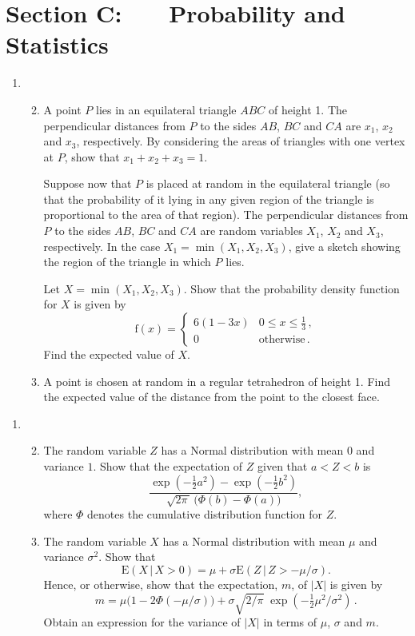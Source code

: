 \documentclass[a4, 11pt]{report}
\newlength{\qspace}
\newcounter{qnumber}
\newenvironment{question}%
 {\vspace{\qspace}
  \begin{enumerate}[\bfseries 1\quad][10]%
    \setcounter{enumi}{\value{qnumber}}%
    \item%
 }
{
  \end{enumerate}
  \filbreak
  \stepcounter{qnumber}
 }
\newenvironment{questionparts}[1][1]%
 {
  \begin{enumerate}[\bfseries (i)]%
    \setcounter{enumii}{#1}
    \addtocounter{enumii}{-1}
    \setlength{\itemsep}{5mm}
    \setlength{\parskip}{8pt}
 }
 {
  \end{enumerate}
 }
\def\f{{\mathrm f}}
\def\E{{\mathrm E}}
\def\le{\leqslant}
\begin{document}
	
	\newpage
\section*{Section C: \ \ \ Probability and Statistics}


\begin{question}
\begin{questionparts}
\item A point $P$ lies in an equilateral 
triangle $ABC$ of height 1. The perpendicular
distances from $P$ to the sides $AB$, $BC$ and $CA$ are
$x_1$, $x_2$ and $x_3$, respectively. By considering the
areas of triangles with one vertex at $P$, show
that  $x_1+x_2+x_3=1$.

Suppose now that $P$ is placed at random in the equilateral triangle
(so that the probability of it lying in any given region of the triangle is
proportional to the area of that region).  The perpendicular
distances from $P$ to the sides $AB$, $BC$ and $CA$ are
random variables $X_1$, $X_2$ and $X_3$, respectively.
In the case $X_1= \min(X_1,X_2,X_3)$, give a sketch showing
the region of the triangle in which $P$ lies. 

Let $X= \min(X_1,X_2,X_3)$. Show that
the probability density function for $X$ is 
given by
\[
\f(x) = 
\begin{cases}
6(1-3x) & 0 \le x \le \frac13\,, \\
0 & \text{otherwise}\,.
\end{cases}
\]
Find the expected value of $X$.

\item
A point is chosen at random in a regular tetrahedron of height 1.
Find the expected value of the distance from the point to the 
closest face.

\end{questionparts}
\end{question}

\begin{question}
\begin{questionparts}
\item The random variable $Z$ has a 
Normal distribution with mean $0$ and variance $1$. 
Show that the expectation of $Z$ given that $a < Z < b$ is
\[
 \frac{\exp(- \frac12 a^2) - \exp(- \frac12 b^2) }
{\sqrt{2\pi\,} \,\big(\Phi(b) - \Phi(a)\big)},
\]
where $\Phi$ denotes the cumulative distribution function for $Z$.

\item The random variable $X$ 
has a
 Normal distribution with mean $\mu$ and variance $\sigma^2$. 
Show that 
\[
\E(X \,\vert\, X>0) = \mu + \sigma \E(Z \,\vert\,Z > -\mu/\sigma).
\]
Hence, or otherwise, 
show that the expectation, $m$, of $\vert X\vert $ is given by			
\[
m= 
\mu \big(1 - 2 \Phi(- \mu / \sigma)\big)
+
 \sigma \sqrt{2 / \pi}\; \exp(- \tfrac12 \mu^2 / \sigma^2) 
\,.
\]
Obtain an expression for the variance 
of $\vert X \vert$ in terms of $\mu $, $\sigma $  and $m$.
\end{questionparts} 
\end{question}
\end{document}
